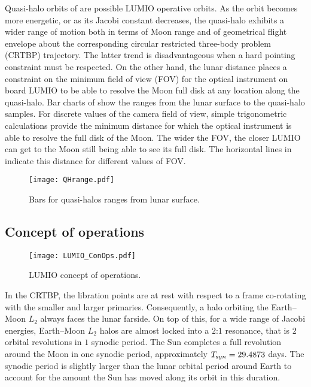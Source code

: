 Quasi-halo orbits of  are possible LUMIO operative orbits. As the orbit becomes more energetic, or as its Jacobi constant decreases, the quasi-halo exhibits a wider range of motion both in terms of Moon range and of geometrical flight envelope about the corresponding circular restricted three-body problem (CRTBP) trajectory. The latter trend is disadvantageous when a hard pointing constraint must be respected. On the other hand, the lunar distance places a constraint on the minimum field of view (FOV) for the optical instrument on board LUMIO to be able to resolve the Moon full disk at any location along the quasi-halo. Bar charts of  show the ranges from the lunar surface to the quasi-halo samples. For discrete values of the camera field of view, simple trigonometric calculations provide the minimum distance for which the optical instrument is able to resolve the full disk of the Moon. The wider the FOV, the closer LUMIO can get to the Moon still being able to see its full disk. The horizontal lines in  indicate this distance for different values of FOV.
%
\begin{figure}[h!]
	\centering
	\texttt{[image: QHrange.pdf]}
	\caption{Bars for quasi-halos ranges from lunar surface.}
	\label{fig:QHranges}
\end{figure}
%


\subsection{Concept of operations}\label{subsec:CONOPS}
%
\begin{figure}[b!]
	\centering
	\texttt{[image: LUMIO\_ConOps.pdf]}
	\caption{LUMIO concept of operations.}
	\label{fig:CONOPS}
\end{figure}
%
In the {CRTBP}, the libration points are at rest with respect to a frame co-rotating with the smaller and larger primaries. Consequently, a halo orbiting the Earth--Moon $L_2$ always faces the lunar farside. On top of this, for a wide range of Jacobi energies, Earth--Moon $L_2$ halos are almost locked into a $2$:$1$ resonance, that is $2$ orbital revolutions in $1$ synodic period. The Sun completes a full revolution around the Moon in one synodic period, approximately $T_{\textrm syn} = 29.4873$ days. The synodic period is slightly larger than the lunar orbital period around Earth to account for the amount the Sun has moved along its orbit in this duration.

